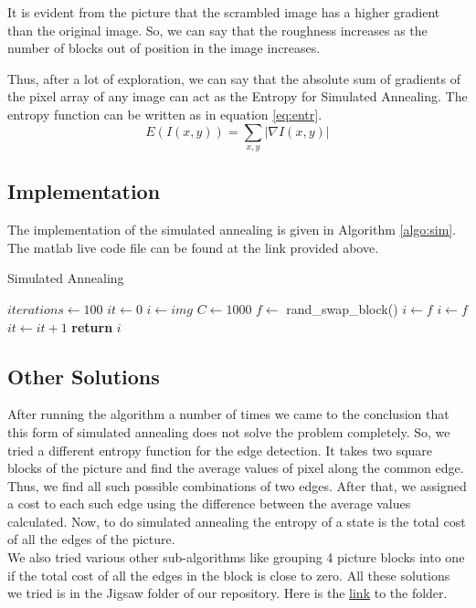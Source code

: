 \documentclass[journal, compsoc]{IEEEtran}
\begin{document}
It is evident from the picture that the scrambled image has a higher gradient than the original image.
So, we can say that the roughness increases as the number of blocks out of position in the image increases.

Thus, after a lot of exploration, we can say that the absolute sum of gradients of the pixel array of any image can act
as the Entropy for Simulated Annealing. The entropy function can be written as in equation \ref{eq:entr}.
\begin{equation}
E(I(x,y)) = \sum_{x,y} |\nabla I(x,y)|
\label{eq:entr}
\end{equation}

\subsection{Implementation}

The implementation of the simulated annealing is given in Algorithm \ref{algo:sim}. The matlab live code file can be found at the link
provided above.

\begin{algorithm}
\caption{Simulated Annealing}\label{algo:sim}
\begin{algorithmic}[1]
\State $iterations \gets 100$
\State $it \gets 0$
\State $i \gets img$ 
\State $C \gets 1000$
\State $f \gets $ rand\_swap\_block() 
\State $i \gets f$
\State $i \gets f$
\EndIf
\State $it \gets it + 1$
\EndWhile
\State \textbf{return } $i$
\EndProcedure
\end{algorithmic}
\end{algorithm}

\subsection{Other Solutions}
After running the algorithm a number of times we came to the conclusion that this form of simulated annealing does not solve the problem
completely. So, we tried a different entropy function for the edge detection. It takes two square blocks of the picture and find the average
values of pixel along the common edge. Thus, we find all such possible combinations of two edges. After that, we assigned a cost to each
such edge using the difference between the average values calculated. Now, to do simulated annealing the entropy of a state is the total cost
of all the edges of the picture.\\
We also tried various other sub-algorithms like grouping 4 picture blocks into one if the total cost of all the edges in the block is close
to zero. All these solutions we tried is in the Jigsaw folder of our repository. Here is the \href{https://github.com/sid-tiw/AI-codes/tree/main/codes/Jigsaw}{link} to the folder.
\end{document}
